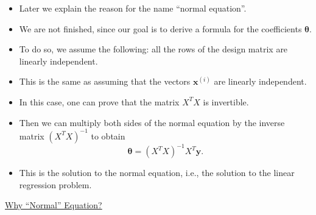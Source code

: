 \documentclass[10pt,american]{scrartcl}
\begin{document}
\begin{itemize}
\[\]
\item Later we explain the reason for the name ``normal equation''.
\item We are not finished, since our goal is to derive a formula for the
coefficients $\boldsymbol{\theta}$.
\item To do so, we assume the following: all the rows of the design matrix
are linearly independent.
\item This is the same as assuming that the vectors $\mathbf{x}^{\left(i\right)}$
are linearly independent.
\item In this case, one can prove that the matrix $X^{T}X$ is invertible.
\item Then we can multiply both sides of the normal equation by the inverse
matrix $\left(X^{T}X\right)^{-1}$ to obtain
\[
\boldsymbol{\theta}=\left(X^{T}X\right)^{-1}X^{T}\mathbf{y}.
\]
\item This is the solution to the normal equation, i.e., the solution to
the linear regression problem.
\end{itemize}
\uline{Why ``Normal'' Equation?}
\end{document}
